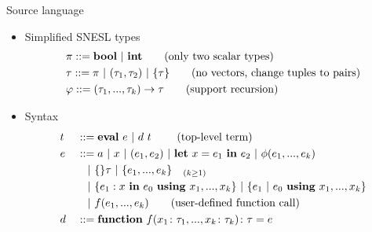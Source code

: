 \documentclass{beamer}
\begin{document}
\begin{frame}{Source language}

\begin{itemize}
\item Simplified SNESL types
	{\small\begin{align*} 
	& \pi ::= \mathbf{bool} \ | \ \mathbf{int}  \tag{only two scalar types}\\ 
	& \tau ::= \pi \ | \ (\tau_1,\tau_2) \ | \ \{\tau\} \tag{no vectors, change tuples to pairs} \\
	& \varphi :: = (\tau_1,...,\tau_k) \rightarrow \tau  \tag{support recursion}
	\end{align*}}	
\item Syntax
	{\small \begin{alignat*}{2} 
	& t &&::= \mathbf{eval} \ e \ | \ d \ t \  \tag{top-level term} \\
	& e &&::=  a \ | \ x  \ | \ (e_1,e_2) \ | \ \mathbf{let} \ x = e_1 \ \mathbf{in} \ e_2 \ | \ \phi{(e_1,...,e_k)} \\
	&   &&  \quad | \ \{ \}\tau \ | \ \{e_1,...,e_k \}_{\quad (k \ge 1)} \\
	&   && \quad | \ \{e_1 : x \ \mathbf{in} \ e_0 \ \mathbf{using} \ x_1,...,x_k\} \ | \ \{ e_1 \ | \ e_0 \ \mathbf{using} \ x_1,...,x_k \}  \\
	&   && \quad | \ f (e_1,...,e_k)  \tag {user-defined function call} \\
	& d &&::= \mathbf{function} \  f (x_1\colon{\tau_1}, ..., x_k\colon\tau_k)\colon{\tau} = e \\
	\end{alignat*}
   }
\end{itemize}
\end{frame}
\end{document}
